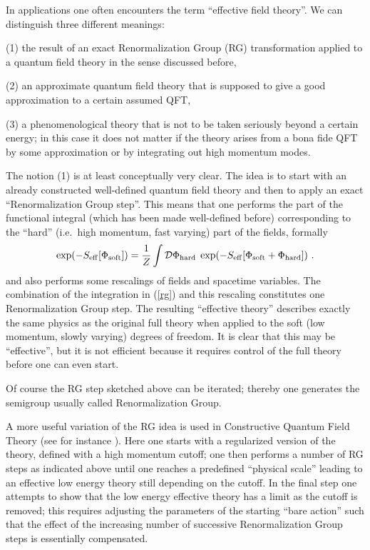 \documentclass[multphys,vecphys]{svmult}
\newcommand{\bea}{\begin{eqnarray}}
\newcommand{\eea}{\end{eqnarray}}
\begin{document}
In applications one often encounters the term
``effective field theory''.
We can distinguish three different meanings:

(1) the result of an exact Renormalization
Group (RG) transformation applied to a quantum field theory in the
sense discussed before, 

(2) an approximate quantum field theory that is supposed to give a 
good approximation to a certain assumed QFT,

(3) a phenomenological theory that is not to be taken seriously beyond a 
certain energy; in this case it does not matter if the theory arises from 
a bona fide QFT by some approximation or by integrating out high momentum 
modes. 


The notion (1) is at least conceptually very clear. The idea is to
start with an already constructed well-defined quantum field theory
and then to apply an exact ``Renormalization
Group step''. This means that one performs the part of the
functional integral (which has been made
well-defined before) corresponding to the ``hard'' (i.e.\ high
momentum, fast varying) part of the fields, formally 
\bea
  \exp(-S_{\rm eff}[\Phi_{\rm soft}])= 
  \frac{1}{Z} \int {\mathcal D}\Phi_{\rm hard}\;
  \exp(-S_{\rm eff}[\Phi_{\rm soft}+\Phi_{\rm hard}])\ .
\label{rg}
\eea
and also performs some rescalings of fields and spacetime variables.
The combination of the integration in (\ref{rg}) and this rescaling 
constitutes one Renormalization Group step.
The resulting ``effective theory'' describes
exactly the same physics as the original full theory when applied to
the soft (low momentum, slowly varying) degrees of freedom. It is
clear that this may be ``effective'', but it is not efficient because
it requires control of the full theory before one can even start.

Of course the RG step sketched above can be iterated; thereby one 
generates the semigroup usually called
Renormalization Group. 

A more useful variation of the RG idea is used in
Constructive Quantum Field Theory (see for
instance \cite{Bal,GK}).  Here one starts with a regularized version
of the theory, defined with a high momentum cutoff; one then performs
a number of RG steps as indicated above until one reaches a predefined
``physical scale'' leading to an effective low
energy theory still depending on the cutoff. In the final step one
attempts to show that the low energy effective theory has a limit as
the cutoff is removed; this requires adjusting the parameters of the
starting ``bare action'' such that the effect of the increasing number
of successive Renormalization Group steps is
essentially compensated.
\end{document}

